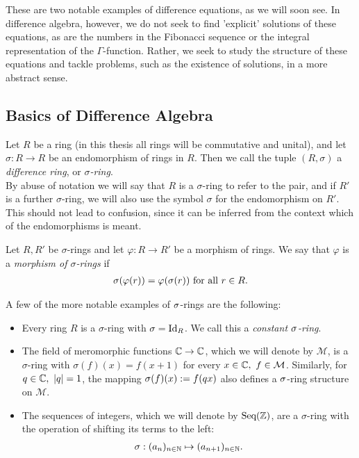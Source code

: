 These are two notable examples of difference equations, as we will soon see. In difference algebra, however, we do not seek to find 'explicit' solutions of these equations,
 as are the numbers in the Fibonacci sequence or the integral representation of the $\Gamma$-function. Rather, we seek to study the structure of these equations and tackle problems, such as the existence of solutions, in a more abstract sense.

\subsection{Basics of Difference Algebra}\label{fundamentos}
\begin{defn}
Let  $R$ be a ring (in this thesis all rings will be commutative and unital), and let
 $\sigma: R \rightarrow R$ be an endomorphism of rings in $R$. Then we call the tuple $(R,\sigma)$ a \emph{difference ring}, or $\sigma$\emph{-ring}.  \\
By abuse of notation we will say that $R$ is a $\sigma$-ring  to refer to the pair, and if $R'$ is a further $\sigma$-ring, we will also use the symbol $\sigma$ for the endomorphism on $R'$. This should not lead to confusion, since it can be inferred from the context which of the endomorphisms is meant. 
\end{defn}

\begin{defn}
Let $R, R'$ be  $\sigma$-rings and let $\varphi: R \rightarrow R'$ be a morphism of rings. We say that $\varphi$ is a \emph{morphism of $\sigma$-rings}  if 
\begin{align*}
\sigma(\varphi(r)) = \varphi(\sigma(r)) \text{ for all } r \in R.
\end{align*}
\end{defn}

\begin{ex} A few of the more notable examples of $\sigma$-rings are the following:

\begin{itemize}
\item Every ring $R$ is a $\sigma$-ring with $\sigma = \text{Id}_R$. We call this a \emph{constant $\sigma$-ring}.  
\item The field of meromorphic functions $\mathbb{C} \rightarrow \mathbb{C}$, which we will denote by $\mathcal{M}$,
is a $\sigma$-ring with $\sigma(f)(x) = f(x+1)$ for every $x \in \mathbb{C}, ~ f \in \mathcal{M}$.
Similarly, for $q \in \mathbb{C}, ~ |q| = 1$, the mapping $\sigma(f)(x) := f(qx)$ also defines a $\sigma$-ring structure on $\mathcal{M}$.
\item The sequences of integers, which we will denote by $\text{Seq}(\mathbb{Z})$, are a $\sigma$-ring with the operation of shifting its terms to the left:
\begin{align*} \sigma: (a_n)_{n \in \mathbb{N}} \mapsto (a_{n+1})_{n \in \mathbb{N}}. \end{align*}
\end{itemize}
\end{ex}

